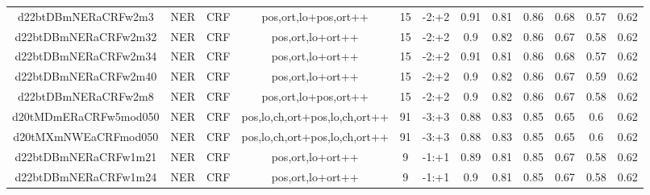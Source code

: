 \documentclass[a4paper]{article}
\begin{document}
\begin{landscape}
\begin{center}
\begin{tabular}{ |c|c|c|c|c|c|c|c|c|c|c|c|}
 
 	
 	\small{ d22btDBmNERaCRFw2m3 } & \small{ NER} & \small{  CRF }  & pos,ort,lo+pos,ort++  &  15 &  \small{  -2:+2 }  &  0.91 & 0.81 & 0.86  &  0.68 & 0.57 & 0.62 \\
 	

 
 	
 	\small{ d22btDBmNERaCRFw2m32 } & \small{ NER} & \small{  CRF }  & pos,ort,lo+ort++  &  15 &  \small{  -2:+2 }  &  0.9 & 0.82 & 0.86  &  0.67 & 0.58 & 0.62 \\
 	

 
 	
 	\small{ d22btDBmNERaCRFw2m34 } & \small{ NER} & \small{  CRF }  & pos,ort,lo+ort++  &  15 &  \small{  -2:+2 }  &  0.91 & 0.81 & 0.86  &  0.68 & 0.57 & 0.62 \\
 	

 
 	
 	\small{ d22btDBmNERaCRFw2m40 } & \small{ NER} & \small{  CRF }  & pos,ort,lo+ort++  &  15 &  \small{  -2:+2 }  &  0.9 & 0.82 & 0.86  &  0.67 & 0.59 & 0.62 \\
 	

 
 	
 	\small{ d22btDBmNERaCRFw2m8 } & \small{ NER} & \small{  CRF }  & pos,ort,lo+pos,ort++  &  15 &  \small{  -2:+2 }  &  0.9 & 0.82 & 0.86  &  0.67 & 0.58 & 0.62 \\
 	

 
 	
 	\small{ d20tMDmERaCRFw5mod050 } & \small{ NER} & \small{  CRF }  & pos,lo,ch,ort+pos,lo,ch,ort++  &  91 &  \small{  -3:+3 }  &  0.88 & 0.83 & 0.85  &  0.65 & 0.6 & 0.62 \\
 	

 
 	
 	\small{ d20tMXmNWEaCRFmod050 } & \small{ NER} & \small{  CRF }  & pos,lo,ch,ort+pos,lo,ch,ort++  &  91 &  \small{  -3:+3 }  &  0.88 & 0.83 & 0.85  &  0.65 & 0.6 & 0.62 \\
 	

 
 	
 	\small{ d22btDBmNERaCRFw1m21 } & \small{ NER} & \small{  CRF }  & pos,ort,lo+ort++  &  9 &  \small{  -1:+1 }  &  0.89 & 0.81 & 0.85  &  0.67 & 0.58 & 0.62 \\
 	

 
 	
 	\small{ d22btDBmNERaCRFw1m24 } & \small{ NER} & \small{  CRF }  & pos,ort,lo+ort++  &  9 &  \small{  -1:+1 }  &  0.9 & 0.81 & 0.85  &  0.67 & 0.58 & 0.62 \\
 	


\end{tabular}
\end{center}
\end{landscape}
\end{document}
